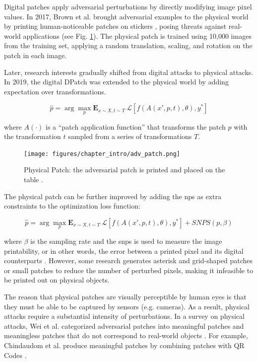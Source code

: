 Digital patches apply adversarial perturbations by directly modifying image pixel values. In 2017, Brown et al. brought adversarial examples to the physical world by printing human-noticeable patches on stickers \citep{brown2017adversarial}, posing threats against real-world applications (see Fig. \ref{fig.physical_patch}). The physical patch is trained using 10,000 images from the training set, applying a random translation, scaling, and rotation on the patch in each image.

Later, research interests gradually shifted from digital attacks to physical attacks. In 2019, the digital DPatch \citep{liu2018dpatch} was extended to the physical world \citep{lee2019physical} by adding expectation over transformations.

\begin{equation}
\hat{p} = \arg \underset{p}{\max}\mathbf{E}_{x \sim X, t \sim T}\ \mathcal{L}[f(A(x', p, t), \theta), y^*]
\end{equation}

where $A(\cdot)$ is a “patch application function” that transforms the patch
$p$ with the transformation $t$ sampled from a series of transformations $T$.

\begin{figure}[H]
\centering
\texttt{[image: figures/chapter\_intro/adv\_patch.png]}
\caption{Physical Patch: the adversarial patch is printed and placed on the table \citep{brown2017adversarial}.}
\label{fig.physical_patch}
\end{figure}

The physical patch can be further improved by adding the \acrfull{nps} as extra constraints to the optimization loss function:

\begin{equation}
\hat{p} = \arg \underset{p}{\max}\mathbf{E}_{x \sim X, t \sim T}\ \mathcal{L}[f(A(x', p, t), \theta), y^*] + SNPS(p, \beta)
\end{equation}

where $\beta$ is the sampling rate and the \acrfull{snps} is used to measure the image printability, or in other words, the error between a printed pixel and its digital counterparts \citep{wang2021daedalus}. However, some research generates asterisk and grid-shaped patches \citep{wu2020dpattack} or small patches \citep{huang2021rpattack} to reduce the number of perturbed pixels, making it infeasible to be printed out on physical objects.

The reason that physical patches are visually perceptible by human eyes is that they must be able to be captured by sensors (e.g. cameras). As a result, physical attacks require a substantial intensity of perturbations. In a survey on physical attacks, Wei et al. categorized adversarial patches into meaningful patches and meaningless patches that do not correspond to real-world objects \citep{wei2023visually}. For example, Chindaudom et al. produce meaningful patches by combining patches with QR Codes \citep{chindaudom2020adversarialqr, chindaudom2022surreptitious}. 

